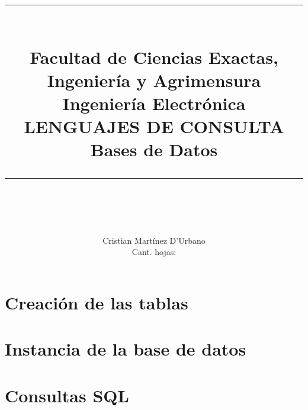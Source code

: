 \documentclass[12pt]{report}
\newcommand{\HRule}[1]{\rule{\linewidth}{#1}}
\begin{document}
{\selectfont
    \title{ \normalsize \textsc{}
		\\ [2.0cm]
		\HRule{0.5pt} \\
		\large {Facultad de Ciencias Exactas, Ingeniería y Agrimensura} \\
		\large {Ingeniería Electrónica} \\
		\LARGE \textbf{\uppercase{Lenguajes de Consulta}} \\
		\large {Bases de Datos} \\
		\HRule{0.5pt} \\ [0.5cm]
	}
}

\author{
    Cristian Martínez D'Urbano\\
    \small Cant. hojas: \pageref{LastPage}
}

\maketitle
\tableofcontents
\newpage

\sectionfont{\scshape}


\section{Creación de las tablas}

\newpage

\section{Instancia de la base de datos}

\newpage

\section{Consultas SQL} 

\end{document}
